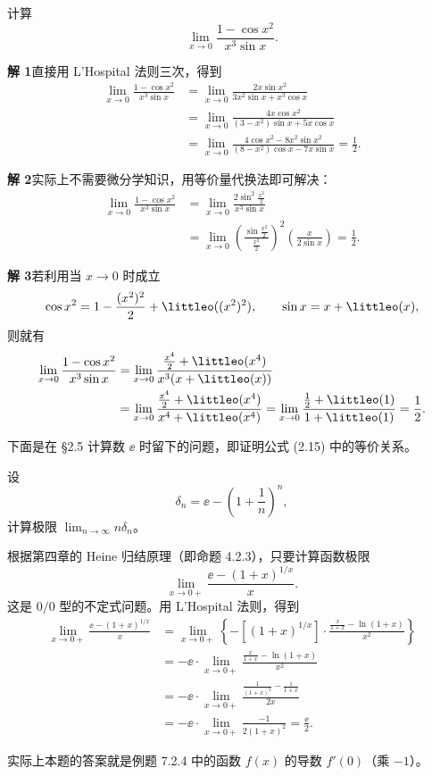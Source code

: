 \begin{xexample}[8.1.3]
计算
\[
  \lim_{x\to0}\frac{1-\cos x^2}{x^3\sin x}.
\]
\end{xexample}
\begin{xsolution}
\textbf{解 1}\quad 直接用 L'Hospital 法则三次，得到
\begin{align*}
  \lim_{x\to0}\frac{1-\cos x^2}{x^3\sin x}
  &=\lim_{x\to0}\frac{2x\sin x^2}{3x^2\sin x+x^3\cos x}\\
  &=\lim_{x\to0}\frac{4x\cos x^2}{(3-x^2)\sin x+5x\cos x}\\
  &=\lim_{x\to0}\frac{4\cos x^2-8x^2\sin x^2}{(8-x^2)\cos x-7x\sin x}
  =\frac12.
\end{align*}

\textbf{解 2}\quad 实际上不需要微分学知识，用等价量代换法即可解决：
\begin{align*}
  \lim_{x\to0}\frac{1-\cos x^2}{x^3\sin x}
  &=\lim_{x\to0}\frac{2\sin^2\frac{x^2}{2}}{x^3\sin x}\\
  &=\lim_{x\to0}\left(\frac{\sin\frac{x^2}{2}}{\frac{x^2}{2}}\right)^2
      \left(\frac{x}{2\sin x}\right)
  =\frac12.
\end{align*}

\textbf{解 3}\quad 若利用当 $x\to0$ 时成立
\[
  \cos x^2=1-\frac{(x^2)^2}{2}+\littleo((x^2)^2),
  \qquad
  \sin x=x+\littleo(x),
\]
则就有
\begin{align*}
  \lim_{x\to0}\frac{1-\cos x^2}{x^3\sin x}
  &=\lim_{x\to0}\frac{\frac{x^4}{2}+\littleo(x^4)}{x^3(x+\littleo(x))}\\
  &=\lim_{x\to0}\frac{\frac{x^4}{2}+\littleo(x^4)}{x^4+\littleo(x^4)}
  =\lim_{x\to0}\frac{\frac12+\littleo(1)}{1+\littleo(1)}
  =\frac12.
\end{align*}
\end{xsolution}

下面是在 §2.5 计算数 $\ee$ 时留下的问题，即证明公式 (2.15) 中的等价关系。

\begin{xexample}[8.1.4]
设
\[
  \delta_n=\ee-\left(1+\frac1n\right)^n,
\]
计算极限 $\displaystyle\lim_{n\to\infty}n\delta_n$。
\end{xexample}
\begin{xsolution}
根据第四章的 Heine 归结原理（即命题 4.2.3），只要计算函数极限
\[
  \lim_{x\to0+}\frac{\ee-(1+x)^{1/x}}{x}.
\]
这是 $0/0$ 型的不定式问题。用 L'Hospital 法则，得到
\begin{align*}
  \lim_{x\to0+}\frac{\ee-(1+x)^{1/x}}{x}
  &=\lim_{x\to0+}\left\{-[(1+x)^{1/x}]\cdot
    \frac{\frac{x}{1+x}-\ln(1+x)}{x^2}\right\}\\
  &=-\ee\cdot\lim_{x\to0+}\frac{\frac{x}{1+x}-\ln(1+x)}{x^2}\\
  &=-\ee\cdot\lim_{x\to0+}
    \frac{\frac1{(1+x)^2}-\frac1{1+x}}{2x}\\
  &=-\ee\cdot\lim_{x\to0+}\frac{-1}{2(1+x)^2}
  =\frac{\ee}{2}.
\end{align*}

\begin{xremark}
实际上本题的答案就是例题 7.2.4 中的函数 $f(x)$ 的导数 $f'(0)$（乘 $-1$）。
\end{xremark}
\end{xsolution}

